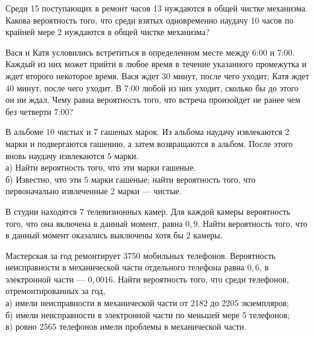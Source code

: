 \newpage\setcounter{zad}{0}



\begin{zkrW}{20}\noindent 
	Среди 15 поступающих в ремонт часов 13 нуждаются в общей чистке механизма. Какова вероятность того, что среди взятых одновременно наудачу 10 часов по крайней мере 2 нуждаются в общей чистке механизма?
 
\end{zkrW}

\begin{zkrW}{20}\noindent 
	Вася и Катя условились встретиться в определенном месте между 6:00 и 7:00. Каждый из них может прийти в любое время в течение указанного промежутка и ждет второго некоторое время. Вася ждет 30 минут, после чего уходит; Катя ждет 40 минут, после чего уходит. В 7:00 любой из них уходит, сколько бы до этого он ни ждал. Чему равна вероятность того, что встреча произойдет не ранее чем без четверти 7:00?
 
\end{zkrW}

\begin{zkrW}{20}\noindent 
	В альбоме 10 чистых и 7 гашеных марок. Из альбома наудачу извлекаются 2 марки и подвергаются гашению, а затем возвращаются в альбом. После этого вновь наудачу извлекаются 5 марки. \\ \indent а) Найти вероятность того, что эти марки гашеные. \\ \indent б) Известно, что эти 5 марки гашеные; найти вероятность того, что первоначально извлеченные 2 марки --- чистые.
 
\end{zkrW}

\begin{zkrW}{20}\noindent 
	В студии находятся 7 телевизионных камер. Для каждой камеры вероятность того, что она включена в данный момент, равна $0{,}9$. Найти вероятность того, что в данный момент оказались выключены хотя бы 2 камеры.
 
\end{zkrW}

\begin{zkrW}{20}\noindent 
	Мастерская за год ремонтирует 3750 мобильных телефонов. Вероятность неисправности в механической части отдельного телефона равна $0{,}6$, в электронной части --- $0{,}0016$. Найти вероятность того, что среди телефонов, отремонтированных за год, \\ \indent а) имели неисправности в механической части от 2182 до 2205 экземпляров; \\ \indent б) имели неисправности в электронной части по меньшей мере 5 телефонов; \\ \indent в) ровно 2565 телефонов имели проблемы в механической части.
 
\end{zkrW}

